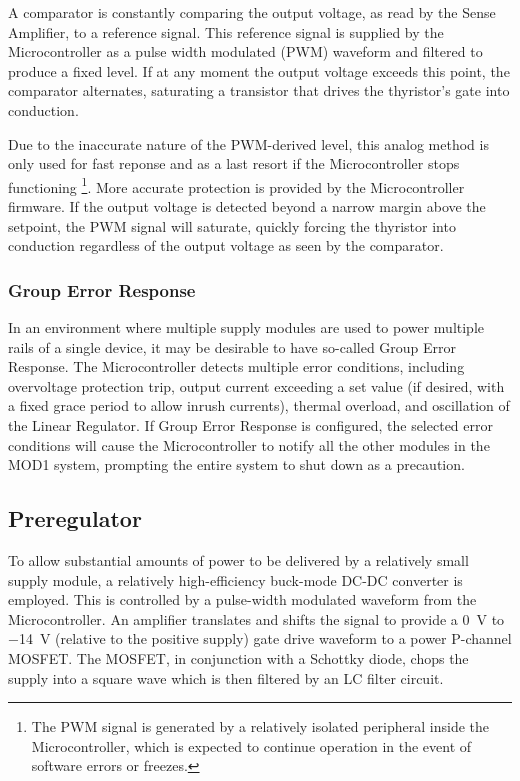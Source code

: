 \documentclass[a4paper,twocolumn,10pt,openany,oneside,final,fleqn]{memoir}
\begin{document}
A comparator is constantly comparing the output voltage, as read by the Sense Amplifier,
to a reference signal. This reference signal is supplied by the Microcontroller as a
pulse width modulated (PWM) waveform and filtered to produce a fixed level. If at any moment
the output voltage exceeds this point, the comparator alternates, saturating a transistor
that drives the thyristor's gate into conduction.

Due to the inaccurate nature of the PWM-derived level, this analog method is only used
for fast reponse and as a last resort if the Microcontroller stops functioning
\footnote{The PWM signal is generated by a relatively isolated peripheral inside the
    Microcontroller, which is expected to continue operation in the event of software
    errors or freezes.}.
More accurate protection is provided by the Microcontroller firmware. If the output
voltage is detected beyond a narrow margin above the setpoint, the PWM signal will
saturate, quickly forcing the thyristor into conduction regardless of the output
voltage as seen by the comparator.

\subsubsection{Group Error Response}

In an environment where multiple supply modules are used to power multiple rails of a
single device, it may be desirable to have so-called Group Error Response. The
Microcontroller detects multiple error conditions, including overvoltage protection trip,
output current exceeding a set value (if desired, with a fixed grace period to allow
inrush currents), thermal overload, and oscillation of the Linear
Regulator. If Group Error Response is configured, the selected error conditions will
cause the Microcontroller to notify all the other modules in the MOD1 system, prompting
the entire system to shut down as a precaution.

\subsection{Preregulator}

To allow substantial amounts of power to be delivered by a relatively small supply module,
a relatively high-efficiency buck-mode DC-DC converter is employed. This is controlled by
a pulse-width modulated waveform from the Microcontroller. An amplifier translates and shifts
the signal to provide a \SI{0}{V} to \SI{-14}{V} (relative to the positive supply) gate
drive waveform to a power P-channel MOSFET. The MOSFET, in conjunction with a Schottky
diode, chops the supply into a square wave which is then filtered by an LC filter circuit.
\end{document}
